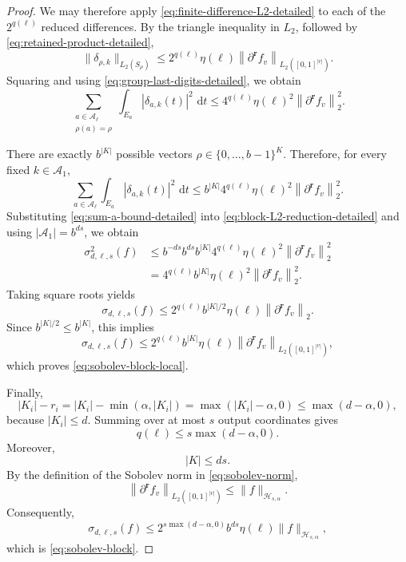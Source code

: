 \documentclass[11pt]{article}
\newcommand{\dd}{\,\mathrm d}
\begin{document}
\begin{proof}
We may therefore apply
\eqref{eq:finite-difference-L2-detailed} to each of the
$2^{q(\boldsymbol\ell)}$ reduced differences.  By the triangle
inequality in $L_2$, followed by
\eqref{eq:retained-product-detailed},
\begin{equation}\label{eq:delta-L2-detailed}
 \|\delta_{\rho,k}\|_{L_2(S_\rho)}
 \le
 2^{q(\boldsymbol\ell)}
 \eta(\boldsymbol\ell)
 \left\|
   \partial^{\boldsymbol r}f_v
 \right\|_{L_2([0,1]^{|v|})}.
\end{equation}
Squaring and using
\eqref{eq:group-last-digits-detailed}, we obtain
\[
 \sum_{\substack{
 a\in\mathcal A_{\boldsymbol\ell}\\
 \rho(a)=\rho}}
 \int_{E_a}|\delta_{a,k}(t)|^2\,\dd t
 \le
 4^{q(\boldsymbol\ell)}
 \eta(\boldsymbol\ell)^2
 \left\|
   \partial^{\boldsymbol r}f_v
 \right\|_2^2.
\]

There are exactly $b^{|K|}$ possible vectors
$\rho\in\{0,\ldots,b-1\}^{K}$.  Therefore, for every fixed
$k\in\mathcal A_1$,
\begin{equation}\label{eq:sum-a-bound-detailed}
 \sum_{a\in\mathcal A_{\boldsymbol\ell}}
 \int_{E_a}|\delta_{a,k}(t)|^2\,\dd t
 \le
 b^{|K|}
 4^{q(\boldsymbol\ell)}
 \eta(\boldsymbol\ell)^2
 \left\|
   \partial^{\boldsymbol r}f_v
 \right\|_2^2.
\end{equation}
Substituting \eqref{eq:sum-a-bound-detailed} into
\eqref{eq:block-L2-reduction-detailed} and using
$|\mathcal A_1|=b^{ds}$, we obtain
\begin{align*}
 \sigma_{d,\boldsymbol\ell,s}^2(f)
 &\le
 b^{-ds}b^{ds}b^{|K|}
 4^{q(\boldsymbol\ell)}
 \eta(\boldsymbol\ell)^2
 \left\|
   \partial^{\boldsymbol r}f_v
 \right\|_2^2\\
 &=
 4^{q(\boldsymbol\ell)}b^{|K|}
 \eta(\boldsymbol\ell)^2
 \left\|
   \partial^{\boldsymbol r}f_v
 \right\|_2^2.
\end{align*}
Taking square roots yields
\begin{equation}\label{eq:sobolev-block-local-strong-detailed}
 \sigma_{d,\boldsymbol\ell,s}(f)
 \le
 2^{q(\boldsymbol\ell)}b^{|K|/2}
 \eta(\boldsymbol\ell)
 \left\|
   \partial^{\boldsymbol r}f_v
 \right\|_2.
\end{equation}
Since $b^{|K|/2}\le b^{|K|}$, this implies
\[
 \sigma_{d,\boldsymbol\ell,s}(f)
 \le
 2^{q(\boldsymbol\ell)}b^{|K|}
 \eta(\boldsymbol\ell)
 \left\|
   \partial^{\boldsymbol r}f_v
 \right\|_{L_2([0,1]^{|v|})},
\]
which proves \eqref{eq:sobolev-block-local}.

Finally,
\[
 |K_i|-r_i
 =
 |K_i|-\min(\alpha,|K_i|)
 =
 \max(|K_i|-\alpha,0)
 \le
 \max(d-\alpha,0),
\]
because $|K_i|\le d$.  Summing over at most $s$ output coordinates
gives
\[
 q(\boldsymbol\ell)
 \le
 s\max(d-\alpha,0).
\]
Moreover,
\[
 |K|\le ds.
\]
By the definition of the Sobolev norm in
\eqref{eq:sobolev-norm},
\[
 \left\|
   \partial^{\boldsymbol r}f_v
 \right\|_{L_2([0,1]^{|v|})}
 \le
 \|f\|_{\mathcal H_{s,\alpha}}.
\]
Consequently,
\[
 \sigma_{d,\boldsymbol\ell,s}(f)
 \le
 2^{s\max(d-\alpha,0)}
 b^{ds}
 \eta(\boldsymbol\ell)
 \|f\|_{\mathcal H_{s,\alpha}},
\]
which is \eqref{eq:sobolev-block}.
\end{proof}
\end{document}
